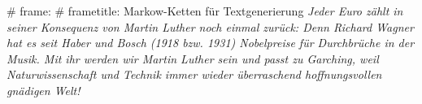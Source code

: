 # frame:
  # frametitle: Markow-Ketten für Textgenerierung
  \emph{%
    \glqq
    Jeder Euro zählt in seiner Konsequenz von Martin Luther noch einmal zurück:
    Denn Richard Wagner hat es seit Haber und Bosch (1918 bzw. 1931)
    Nobelpreise für Durchbrüche in der Musik. Mit ihr werden wir Martin Luther sein
    und passt zu Garching, weil Naturwissenschaft und Technik immer wieder
    überraschend hoffnungsvollen gnädigen Welt!%
    \grqq
  }
